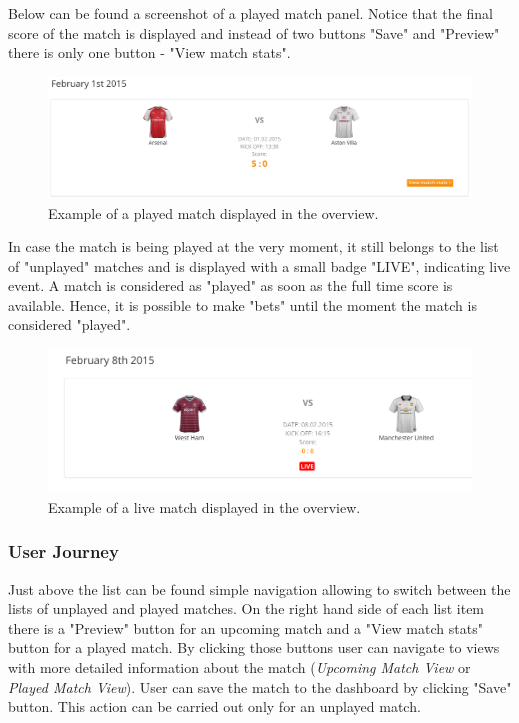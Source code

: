 Below can be found a screenshot of a played match panel. Notice that the final score of the match is displayed and instead of two buttons "Save" and "Preview" there is only one button - "View match stats".

\begin{figure}[H]
	\begin{center}
		\includegraphics[width=.90\textwidth]{impl/images/playedMatch}
		\caption{Example of a played match displayed in the overview.} \label{fig:using:playedmatch}
	\end{center}
\end{figure}

In case the match is being played at the very moment, it still belongs to the list of "unplayed" matches and is displayed with a small badge "LIVE", indicating live event. A match is considered as "played" as soon as the full time score is available. Hence, it is possible to make "bets" until the moment the match is considered "played".

\begin{figure}[H]
	\begin{center}
		\includegraphics[width=.90\textwidth]{impl/images/liveMatch}
		\caption{Example of a live match displayed in the overview.} \label{fig:using:livematch}
	\end{center}
\end{figure}

\subsubsection*{User Journey}
\label{subsec:matchesoviewuserjourney}
Just above the list can be found simple navigation allowing to switch between the lists of unplayed and played matches. On the right hand side of each list item there is a "Preview" button for an upcoming match and a "View match stats" button for a played match. By clicking those buttons user can navigate to views with more detailed information about the match (\emph{Upcoming Match View} or \emph{Played Match View}). User can save the match to the dashboard by clicking "Save" button. This action can be carried out only for an unplayed match.  

